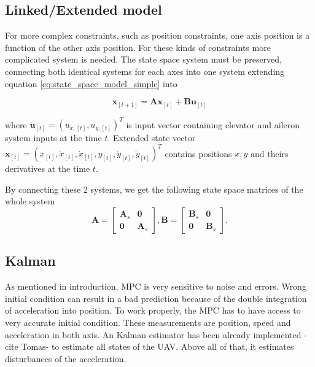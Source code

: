 \documentclass{article}
\begin{document}
\subsection{{\color{red} Linked/Extended} model}		%
For more complex constraints, such as position constraints, one axis position is a function of the other axis position. For these kinds of constraints more complicated system is needed. The state space system must be preserved, connecting both identical systems for each axes into one system extending equation \ref{eq:state_space_model_simple} into 

\begin{equation}
\label{eq:state_space_model_simple}
\textbf{x}_{[t+1]} = \textbf{A} \textbf{x}_{[t]} +\textbf{B} \textbf{u}_{[t]}
\end{equation}

where $\textbf{u}_{[t]} = (u_{x,[t]}, u_{y,[t]})^T$ is input vector containing elevator and aileron system inputs at the time $t$. Extended state vector $\textbf{x}_{[t]} = (x_{[t]}, \dot{x}_{[t]}, \dot{x}_{[t]}, y_{[t]}, \dot{y}_{[t]}, \ddot{y}_{[t]})^T$ contains positions $x,y$ and theirs derivatives at the time $t$. 

By connecting these 2 systems, we get the following state space matrices of the whole system
\begin{equation}
\label{eq:state_space}
\textbf{A} = \begin{bmatrix}
	\textbf{A}_s & \textbf{0}	\\
	\textbf{0}   & \textbf{A}_s
\end{bmatrix}, \textbf{B} = \begin{bmatrix}
	\textbf{B}_s & \textbf{0}	\\
	\textbf{0}   & \textbf{B}_s
\end{bmatrix}.
\end{equation}


\subsection{Kalman}
As mentioned in introduction, MPC is very sensitive to noise and errors. Wrong initial condition can result in a bad prediction because of the double integration of acceleration into position. To work properly, the MPC has to have access to very accurate initial condition. These measurements are position, speed and acceleration in both axis. An Kalman estimator has been already implemented -cite Tomas- to estimate all states of the UAV. Above all of that, it estimates disturbances of the acceleration.
\end{document}
